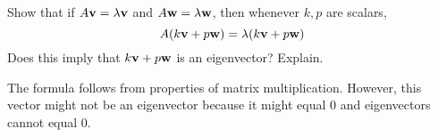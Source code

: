 \begin{ex}
  Show that if $A\vect{v}=\eigenvar \vect{v}$ and
  $A\vect{w}=\eigenvar \vect{w}$, then whenever $k,p$ are scalars,
  \begin{equation*}
    A(k\vect{v}+p\vect{w}) =\eigenvar (k\vect{v}+p\vect{w})
  \end{equation*}
  Does this imply that $k\vect{v}+p\vect{w}$ is an eigenvector? Explain.
  \begin{sol}
    The formula follows from properties of matrix
    multiplication. However, this vector might not be an eigenvector
    because it might equal $0$ and eigenvectors cannot equal $0$.
  \end{sol}
\end{ex}

